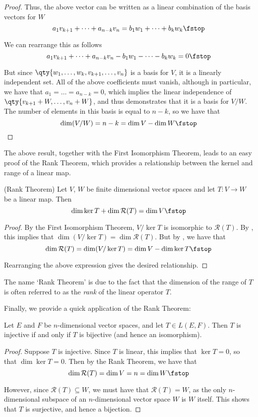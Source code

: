 \begin{proof}
   Thus, the above vector can be written as a linear combination of the basis vectors for \( W \)
   \[ a_1v_{k+1}+\dots+a_{n-k}v_n=b_1w_1+\dots+b_kw_k\fstop \]

   We can rearrange this as follows
   \[ a_1v_{k+1}+\dots+a_{n-k}v_n-b_1w_1-\dots-b_kw_k=0\fstop \]

   But since \( \qty{w_1,\dots,w_k,v_{k+1},\dots,v_n} \) is a basis for \( V \), it is a linearly independent set. All of the above coefficients must vanish, although in particular, we have that \( a_1=\dots=a_{n-k}=0 \), which implies the linear independence of \( \qty{v_{k+1}+W,\dots,v_n+W} \), and thus demonstrates that it is a basis for \( V/W \). The number of elements in this basis is equal to \( n-k \), so we have that
   \[ \dim(V/W)=n-k=\dim V-\dim W\fstop \]
 \end{proof}

 The above result, together with the First Isomorphism Theorem, leads to an easy proof of the Rank Theorem, which provides a relationship between the kernel and range of a linear map.
 
 \begin{theorem}
   (Rank Theorem) Let \( V \), \( W \) be finite dimensional vector spaces and let \( T:V\to W \) be a linear map. Then
   \[ \dim\ker T+\dim\mathcal{R}(T)=\dim V\fstop \]
 \end{theorem}
 \begin{proof}
   By the First Isomorphism Theorem, \( V/\ker T \) is isomorphic to \( \mathcal{R}(T) \). By , this implies that \( \dim (V/\ker T)=\dim\mathcal{R}(T) \). But by , we have that
   \[ \dim\mathcal{R}(T)=\dim (V/\ker T)=\dim V-\dim\ker T\fstop \]

   Rearranging the above expression gives the desired relationship.
 \end{proof}

 The name `Rank Theorem' is due to the fact that the dimension of the range of \( T \) is often referred to as the \emph{rank} of the linear operator \( T \).

 \vspace{3mm}
 
 Finally, we provide a quick application of the Rank Theorem:
 \begin{proposition}
   Let \( E \) and \( F \) be \( n \)-dimensional vector spaces, and let \( T\in L(E,F) \). Then \( T \) is injective if and only if \( T \) is bijective (and hence an isomorphism).
 \end{proposition}
 \begin{proof}
   Suppose \( T \) is injective. Since \( T \) is linear, this implies that \( \ker T=\qty{0} \), so that \( \dim\ker T=0 \). Then by the Rank Theorem, we have that
   \[ \dim\mathcal{R}(T)=\dim V=n=\dim W\fstop \]

   However, since \( \mathcal{R}(T)\subseteq W \), we must have that \( \mathcal{R}(T)=W \), as the only \( n \)-dimensional subspace of an \( n \)-dimensional vector space \( W \) is \( W \) itself. This shows that \( T \) is surjective, and hence a bijection.
 \end{proof}

